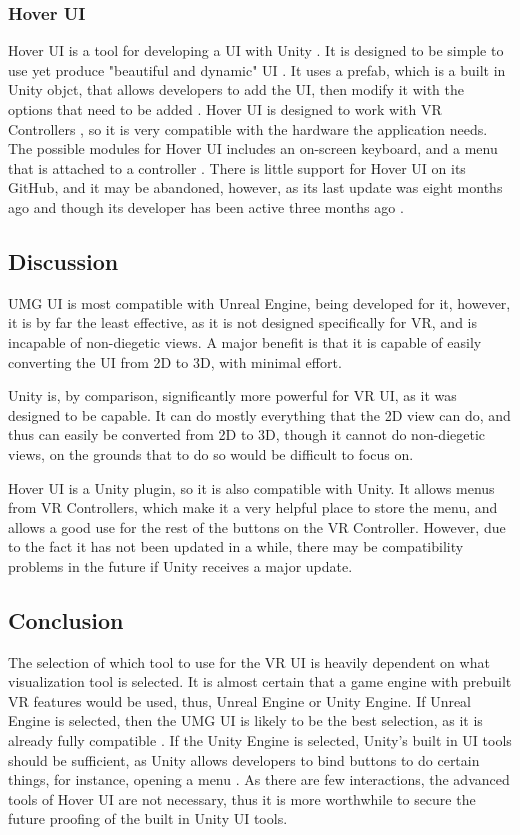 \documentclass[onecolumn, draftclsnofoot,10pt, compsoc]{IEEEtran}
\begin{document}
\subsubsection{Hover UI}
Hover UI is a tool for developing a UI with Unity \cite{J10}. It is designed to be simple to use yet produce "beautiful and dynamic" UI \cite{J10}. It uses a prefab, which is a built in Unity objct, that allows developers to add the UI, then modify it with the options that need to be added \cite{J10}. Hover UI is designed to work with VR Controllers \cite{J10}, so it is very compatible with the hardware the application needs. The possible modules for Hover UI includes an on-screen keyboard, and a menu that is attached to a controller \cite{J10}. There is little support for Hover UI on its GitHub, and it may be abandoned, however, as its last update was eight months ago and though its developer has been active three months ago \cite{J10}. 

\subsection{Discussion}
UMG UI is most compatible with Unreal Engine, being developed for it, however, it is by far the least effective, as it is not designed specifically for VR, and is incapable of non-diegetic views. A major benefit is that it is capable of easily converting the UI from 2D to 3D, with minimal effort.

Unity is, by comparison, significantly more powerful for VR UI, as it was designed to be capable. It can do mostly everything that the 2D view can do, and thus can easily be converted from 2D to 3D, though it cannot do non-diegetic views, on the grounds that to do so would be difficult to focus on.

Hover UI is a Unity plugin, so it is also compatible with Unity. It allows menus from VR Controllers, which make it a very helpful place to store the menu, and allows a good use for the rest of the buttons on the VR Controller. However, due to the fact it has not been updated in a while, there may be compatibility problems in the future if Unity receives a major update.

\subsection{Conclusion}
The selection of which tool to use for the VR UI is heavily dependent on what visualization tool is selected. It is almost certain that a game engine with prebuilt VR features would be used, thus, Unreal Engine or Unity Engine. If Unreal Engine is selected, then the UMG UI is likely to be the best selection, as it is already fully compatible \cite{J2}.
If the Unity Engine is selected, Unity's built in UI tools should be sufficient, as Unity allows developers to bind buttons to do certain things, for instance, opening a menu \cite{J3}. As there are few interactions, the advanced tools of Hover UI are not necessary, thus it is more worthwhile to secure the future proofing of the built in Unity UI tools.
\end{document}
